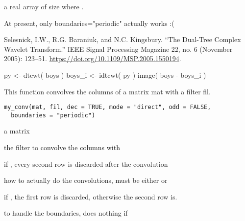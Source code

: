 \documentclass[a4paper]{book}
\begin{document}
%
\begin{Value}
a real array of size  where .
\end{Value}
%
\begin{Note}\relax
At present, only boundaries="periodic" actually works :(
\end{Note}
%
\begin{References}\relax
Selesnick, I.W., R.G. Baraniuk, and N.C. Kingsbury. “The Dual-Tree Complex Wavelet Transform.” IEEE Signal Processing Magazine 22, no. 6 (November 2005): 123–51. \url{https://doi.org/10.1109/MSP.2005.1550194}.
\end{References}
%
\begin{SeeAlso}\relax
{}
\end{SeeAlso}
%
\begin{Examples}
\begin{ExampleCode}
py <- dtcwt( boys )
boys_i <- idtcwt( py )
image( boys - boys_i )
\end{ExampleCode}
\end{Examples}
%
\begin{Description}\relax
This function convolves the columns of a matrix mat with a filter fil.
\end{Description}
%
\begin{Usage}
\begin{verbatim}
my_conv(mat, fil, dec = TRUE, mode = "direct", odd = FALSE,
  boundaries = "periodic")
\end{verbatim}
\end{Usage}
%
\begin{Arguments}
\begin{ldescription}
\item[\code{mat}] a matrix

\item[\code{fil}] the filter to convolve the columns with

\item[\code{dec}] if , every second row is discarded after the convolution

\item[\code{mode}] how to actually do the convolutions, must be either  or 

\item[\code{odd}] if , the first row is discarded, otherwise the second row is.

\item[\code{how}] to handle the boundaries, does nothing if 
\end{ldescription}
\end{Arguments}
\end{document}
